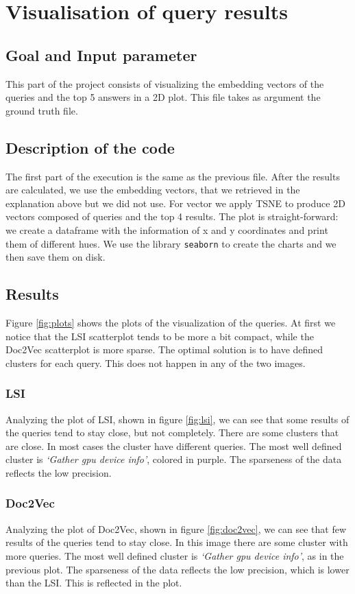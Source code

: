 \documentclass [14 pt]{article}
\begin{document}
\section{Visualisation of query results} %
\subsection{Goal and Input parameter} %
This part of the project consists of visualizing the embedding vectors of the queries and the top 5 answers in a 2D plot.
This file takes as argument the ground truth file.

\subsection{Description of the code} %
The first part of the execution is the same as the previous file. After the results are calculated, we use the embedding vectors, that we retrieved in the explanation above but we did not use. For vector we apply TSNE to produce 2D vectors composed of queries and the top 4 results.
The plot is straight-forward: we create a dataframe with the information of x and y coordinates and print them of different hues. We use the library \texttt{seaborn} to create the charts and we then save them on disk.

\subsection{Results} %
Figure \ref{fig:plots} shows the plots of the visualization of the queries. At first we notice that the LSI scatterplot tends to be more a bit compact, while the Doc2Vec scatterplot is more sparse. The optimal solution is to have defined clusters for each query. This does not happen in any of the two images.\\
\subsubsection{LSI}
Analyzing the plot of LSI, shown in figure \ref{fig:lsi}, we can see that some results of the queries tend to stay close, but not completely. There are some clusters that are close.
In most cases the cluster have different queries. The most well defined cluster is \emph{`Gather gpu device info'}, colored in purple. The sparseness of the data reflects the low precision.

\subsubsection{Doc2Vec}
Analyzing the plot of Doc2Vec, shown in figure \ref{fig:doc2vec}, we can see that few results of the queries tend to stay close.
In this image there are some cluster with more queries. The most well defined cluster is \emph{`Gather gpu device info'}, as in the previous plot.
The sparseness of the data reflects the low precision, which is lower than the LSI. This is reflected in the plot. 
\end{document}
